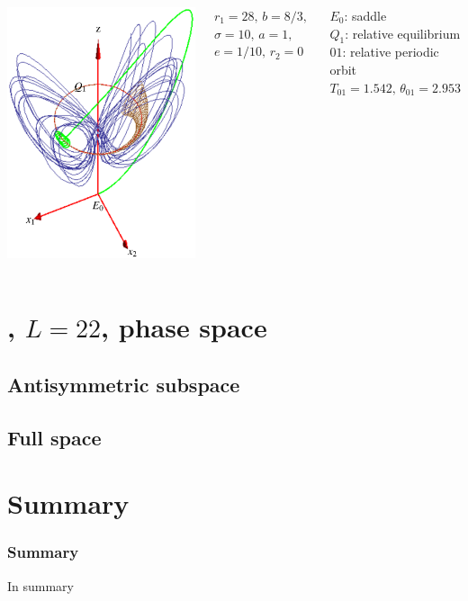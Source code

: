 \documentclass{beamer}
\begin{document}
\begin{frame}
  \begin{columns}[t]
	\begin{block}{}
	\begin{center}
		\includegraphics[width=.7\textwidth]{../../figs/CLE.eps}
	\end{center}
	\end{block}
	\begin{block}{ }
	 ${r_1=28,}\, {b=8/3,}\,$ ${\sigma=10,}\, {a=1,}\,$ ${e=1/10,}\, {r_2=0}$
	\end{block}
	\begin{block}{ }
	  $E_0$: saddle\\
	  $Q_1$: relative equilibrium\\ 
	  $01$:  relative periodic orbit $T_{01}=1.542,\, \theta_{01}=2.953$
	\end{block}
   \end{columns}
\end{frame}






\section[\KSe]{\KS, $L=22$, phase space }

\subsection{\KSe}

\subsection{Antisymmetric subspace}

\subsection{Full space}

\section*{Summary}
\begin{frame}
\frametitle<presentation>{Summary}

In summary

\end{frame}
\end{document}

